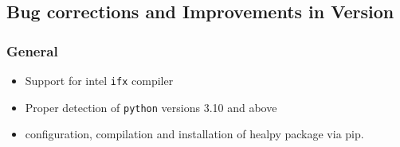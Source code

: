 \documentclass[12pt,twoside]{article}
\newcommand{\linklatexhtml}[3]{%
\latexhtml{\htmladdnormallink{#1}{#2}}{\htmladdnormallink{#1}{#3}}}
\begin{document}
\subsection{Bug corrections and Improvements in Version \hpxversion}%
\subsubsection[General]{General}
\begin{itemize}
  \item Support for intel \texttt{ifx} compiler
  \item Proper detection of \texttt{python} versions 3.10 and above
  \item configuration, compilation and installation of healpy package via pip.
\end{itemize}
\end{document}
